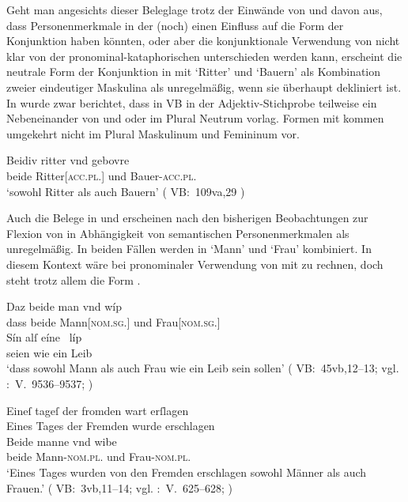 Geht man angesichts dieser Beleglage trotz der Einwände von
\citet{gjelsten1980} und \citet{ksw2} davon aus, dass
Personenmerkmale in der \KC{} (noch) einen Einfluss auf die
Form der Konjunktion haben könnten, oder aber die konjunktionale Verwendung von
 nicht klar von der pronominal-kataphorischen
unterschieden werden kann, erscheint die neutrale Form der
Konjunktion in  mit  `Ritter' und
 `Bauern' als Kombination zweier eindeutiger Maskulina als
unregelmäßig, wenn sie überhaupt dekliniert ist. In
 wurde zwar berichtet, dass in VB in der
Adjektiv-Stichprobe teilweise ein Nebeneinander von  und 
oder  im Plural Neutrum vorlag. Formen mit
 kommen umgekehrt nicht im Plural Maskulinum und Femininum vor.

\begin{exe}
\ex\label{ex:rittergebure}
	\gll Beidiv ritter vnd gebovre \\
		beide Ritter[\textsc{acc.pl.\MascM}] und Bauer-\textsc{acc.pl.\MascM} \\
	\trans `sowohl Ritter als auch Bauern'
		(%
			VB:~109va,29%
		)
\end{exe}

Auch die Belege in  und  erscheinen
nach den bisherigen Beobachtungen zur Flexion von  in Abhängigkeit
von semantischen Personenmerkmalen
als unregelmäßig. In beiden Fällen werden in
 `Mann' und `Frau' kombiniert. In diesem Kontext wäre bei
pronominaler Verwendung von  mit  zu
rechnen, doch steht trotz allem die Form .

\begin{exe}
\ex \label{ex:konjmixbeide1}
	\begin{xlist}
	\ex \gll Daz beide man vnd wíp \\
			dass beide Mann[\textsc{nom.sg.\MascM}] und Frau[\textsc{nom.sg.\NeutF}] \\
	\sn \gll Sín alſ eíne~ líp \\
			seien wie ein Leib \\
		\trans `dass sowohl Mann als auch Frau wie ein Leib sein sollen'
			(%
				VB:~45vb,12--13; vgl.
				\KC:~V.~9536--9537;
				\cite[257]{schroeder1895}
			)
		\label{ex:konjmixbeide1_1}

	\ex \label{ex:konjmixbeide1_2}
		\gll Eineſ tageſ der fromden wart erſlagen \\
			Eines Tages der Fremden wurde erschlagen \\
		\textelp{}
	\sn \gll Beide manne vnd wibe \\
			beide Mann-\textsc{nom.pl.\MascM} und Frau-\textsc{nom.pl.\NeutF} \\
		\trans `Eines Tages wurden von den Fremden erschlagen \textelp{} 
			sowohl Männer als auch Frauen.'
			(%
				VB:~3vb,11--14; vgl.
				\KC:~V.~625--628;
				\cite[93]{schroeder1895}%
			)
	\end{xlist}
\end{exe}


